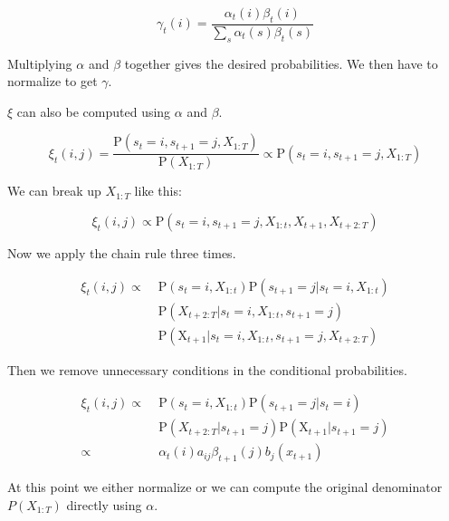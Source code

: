 \begin{equation}
   \gamma_t(i) = \frac{\alpha_{t}(i) \beta_{t}(i)}{\sum_{s} \alpha_{t}(s) \beta_{t}(s)}
\end{equation}

Multiplying $\alpha$ and $\beta$ together gives the desired probabilities. We then have to normalize to get $\gamma$. 

$\xi$ can also be computed using $\alpha$ and $\beta$. 

\begin{equation}
   \xi_{t}(i, j)=\frac{\mathrm{P}\left(s_{t}=i, s_{t+1}=j, X_{1: T}\right)}{\mathrm{P}\left(X_{1: T}\right)} \propto \mathrm{P}\left(s_{t}=i, s_{t+1}=j, X_{1: T}\right)
\end{equation}

We can break up $X_{1:T}$ like this:

\begin{equation}
   \xi_{t}(i, j) \propto \mathrm{P}\left(s_{t}=i, s_{t+1}=j, X_{1: t}, X_{t+1},X_{t+2:T}\right)
\end{equation}

Now we apply the chain rule three times.

\begin{equation}
  \begin{aligned}
\xi_{t}(i, j) \propto \;  &\mathrm{P}\left(s_{t}=i, X_{1: t}\right) \mathrm{P}\left(s_{t+1}=j | s_{t}=i, X_{1: t}\right) \\
&\mathrm{P}\left(X_{t+2: T} | s_{t}=i, X_{1: t}, s_{t+1}=j\right) \\
&\mathrm{P}\left(\mathrm{X}_{t+1} | s_{t}=i, X_{1: t}, s_{t+1}=j, X_{t+2: T}\right)
\end{aligned} 
\end{equation}

Then we remove unnecessary conditions in the conditional probabilities.

\begin{equation}
\begin{aligned}
\xi_{t}(i, j) \propto \; &\mathrm{P}\left(s_{t}=i, X_{1: t}\right) \mathrm{P}\left(s_{t+1}=j | s_{t}=i\right) \\
&\mathrm{P}\left(X_{t+2: T} | s_{t+1}=j\right) \mathrm{P}\left(\mathrm{X}_{t+1} | s_{t+1}=j\right) \\
\propto \;  & \alpha_{t}(i) a_{i j} \beta_{t+1}(j) b_{j}(x_{t+1})
\end{aligned} 
\end{equation}

At this point we either normalize or we can compute the original denominator $P(X_{1:T})$ directly using $\alpha$.

